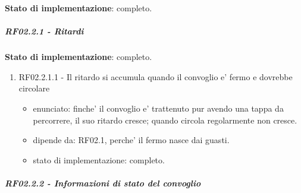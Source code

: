 \documentclass[11pt]{article}
\begin{document}
\textbf{Stato di implementazione}: completo.
\subparagraph{RF02.2.1 - Ritardi}
\label{sec:orgfb2b90e}

\textbf{Stato di implementazione}: completo.
\begin{enumerate}
\item RF02.2.1.1 - Il ritardo si accumula quando il convoglio e' fermo e dovrebbe circolare
\label{sec:org80d9b5b}
\begin{itemize}
\item enunciato: finche' il convoglio e' trattenuto pur avendo una tappa da percorrere, il suo ritardo
cresce; quando circola regolarmente non cresce.
\item dipende da: RF02.1, perche' il fermo nasce dai guasti.
\item stato di implementazione: completo.
\end{itemize}
\end{enumerate}
\subparagraph{RF02.2.2 - Informazioni di stato del convoglio}
\label{sec:orgc8d9bcf}
\end{document}
